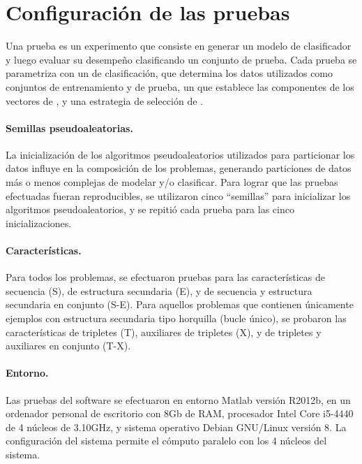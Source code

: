%
%
%
\section{Configuración de las pruebas}
%
Una prueba es un experimento que consiste en generar un modelo de
clasificador y luego evaluar su desempeño clasificando un conjunto de
prueba.
Cada prueba se parametriza con un  de clasificación, que
determina los datos utilizados como conjuntos de entrenamiento y de
prueba, un  que establece las componentes de
los vectores de , y una estrategia de selección de .

\paragraph{Semillas pseudoaleatorias.}
La inicialización de los algoritmos pseudoaleatorios utilizados para
particionar los datos influye en la composición de los problemas,
generando particiones de datos más o menos complejas de modelar y/o
clasificar.
Para lograr que las pruebas efectuadas fueran reproducibles, se
utilizaron cinco ``semillas'' para inicializar los algoritmos
pseudoaleatorios, y se repitió cada prueba para las cinco
inicializaciones.

\paragraph{Características.}
Para todos los problemas, se efectuaron pruebas para las
características de secuencia (S), de estructura secundaria (E), y de
secuencia y estructura secundaria en conjunto (S-E).
Para aquellos problemas que contienen únicamente ejemplos con
estructura secundaria tipo horquilla (bucle único), se probaron las
características de tripletes (T), auxiliares de tripletes (X), y de
tripletes y auxiliares en conjunto (T-X).

\paragraph{Entorno.}
Las pruebas del software se efectuaron en entorno Matlab versión
R2012b, en un ordenador personal de escritorio con 8\si{\giga b} de
RAM, procesador Intel Core i5-4440 de 4 núcleos de 3.10\si{\giga Hz},
y sistema operativo Debian GNU/Linux versión 8.
La configuración del sistema permite el cómputo paralelo con los 4
núcleos del sistema.

